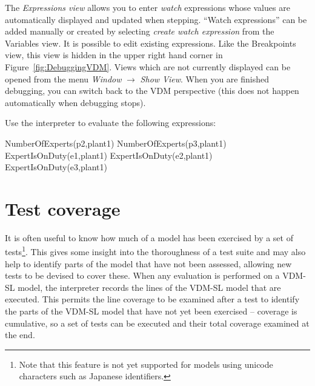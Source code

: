 The \emph{Expressions view} allows you to enter \emph{watch} expressions whose values are automatically displayed and updated when stepping. ``Watch expressions'' can be added manually or created by selecting \emph{create watch expression} from the Variables view. It is possible to edit existing expressions.  Like the Breakpoints view, this view is hidden in the upper right hand corner in Figure~\ref{fig:DebuggingVDM}.  Views which are not currently displayed can be opened from the menu \emph{Window} $\rightarrow$ \emph{Show View}.  When you are finished debugging, you can switch back to the VDM perspective (this does not happen automatically when debugging stops).

\begin{myexercise}
\label{ex:tool-monitor}Use the interpreter to evaluate the
  following expressions:
\begin{vdmsl}
NumberOfExperts(p2,plant1)
NumberOfExperts(p3,plant1)
ExpertIsOnDuty(e1,plant1)
ExpertIsOnDuty(e2,plant1)
ExpertIsOnDuty(e3,plant1)
\end{vdmsl}
\end{myexercise}
%
\section{Test coverage}\label{sec:testcov}
It is often useful to know how much of a model has been exercised by a set of tests\footnote{Note that this feature is not yet supported for models using unicode characters such as Japanese identifiers.}. 
This gives some insight into the thoroughness of a test suite and may also help to identify parts of the model that have not been assessed, allowing new tests to be devised to cover these. When any evaluation is performed on a VDM-SL model, the interpreter records the lines of the VDM-SL model that are executed. This permits the line coverage to be examined after a test to identify the parts of the
VDM-SL model that have not yet been exercised -- coverage is cumulative, so a set of tests can be executed and their total coverage examined at the end.

